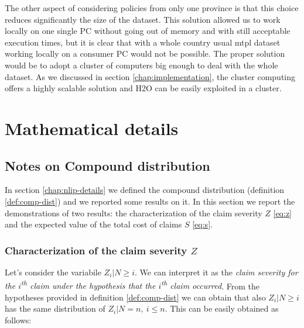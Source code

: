 \documentclass[a4paper, twoside, openright, 12pt]{report}
\theoremstyle{definition}
\theoremstyle{definition}
\theoremstyle{definition}
\theoremstyle{remark}
\begin{document}
The other aspect of considering policies from only one province is that this choice reduces significantly the size of the dataset. This solution allowed us to work locally on one single PC without going out of memory and with still acceptable execution times, but it is clear that with a whole country usual \ac{mtpl} dataset working locally on a consumer PC would not be possible. The proper solution would be to adopt a cluster of computers big enough to deal with the whole dataset. As we discussed in section \ref{chap:implementation}, the cluster computing offers a highly scalable solution and H2O can be easily exploited in a cluster.

\appendix

\hypertarget{mathematical-details}{%
\chapter{Mathematical details}\label{mathematical-details}}

\hypertarget{chap:appendix-notes-on-compound-distribution}{%
\section{Notes on Compound distribution}\label{chap:appendix-notes-on-compound-distribution}}

In section \ref{chap:nlip-details} we defined the compound distribution (definition \ref{def:comp-dist}) and we reported some results on it. In this section we report the demonstrations of two results: the characterization of the claim severity \(Z\) \eqref{eq:z} and the expected value of the total cost of claims \(S\) \eqref{eq:s}.

\hypertarget{characterization-of-the-claim-severity-z}{%
\subsection{\texorpdfstring{Characterization of the claim severity \(Z\)}{Characterization of the claim severity Z}}\label{characterization-of-the-claim-severity-z}}

Let's consider the variabile \(Z_i|N\ge i\). We can interpret it as the \emph{claim severity for the \(i\)\textsuperscript{th} claim under the hypothesis that the \(i\)\textsuperscript{th} claim occurred}. From the hypotheses provided in definition \ref{def:comp-dist} we can obtain that also \(Z_i|N\ge i\) has the same distribution of \(Z_i|N=n, \ i\le n\). This can be easily obtained as follows:
\end{document}

